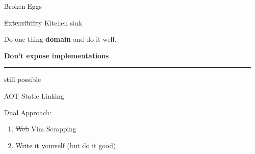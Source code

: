 \documentclass{beamer}
\begin{document}
\begin{frame}{Broken Eggs}

	\begin{block}{\st{Extensibility} Kitchen sink}

		\vspace{0.5em}

		Do one \st{thing} \textbf{domain} and do it well.

		\vspace{0.5em}

		\textbf{Don't expose implementations}

	\end{block}

	\rule{\textwidth}{0.1em}

	 still possible

\end{frame}


\begin{frame}{AOT Static Linking}

	\hspace{0.1em}

	Dual Approach:

	\begin{enumerate}

		\item \st{Web} Vim Scrapping

		\item Write it yourself (but do it good)

	\end{enumerate}

\end{frame}
\end{document}
